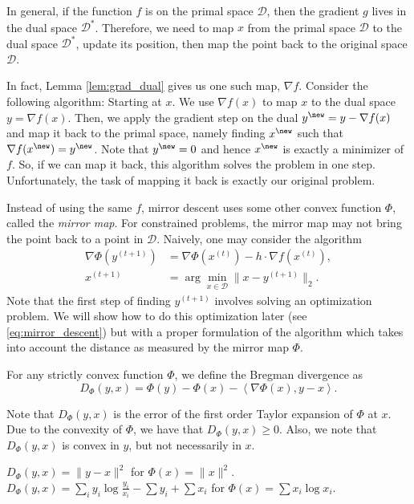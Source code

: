 In general, if the function $f$ is on the primal space $\mathcal{D}$,
then the gradient $g$ lives in the dual space $\mathcal{D}^{*}$.
Therefore, we need to map $x$ from the primal space $\mathcal{D}$
to the dual space $\mathcal{D}^{*}$, update its position, then map
the point back to the original space $\mathcal{D}$.

In fact, Lemma \ref{lem:grad_dual} gives us one such map, $\nabla f$.
Consider the following algorithm: Starting at $x$. We use $\nabla f(x)$
to map $x$ to the dual space $y=\nabla f(x)$. Then, we apply the
gradient step on the dual $y^{\new}=y-\nabla f(x)$ and map it back
to the primal space, namely finding $x^{\new}$ such that $\nabla f(x^{\new})=y^{\new}$.
Note that $y^{\new}=0$ and hence $x^{\new}$ is exactly a minimizer
of $f$. So, if we can map it back, this algorithm solves the problem
in one step. Unfortunately, the task of mapping it back is exactly
our original problem.

Instead of using the same $f$, mirror descent uses some other convex
function $\Phi$, called the \emph{mirror map}. For constrained problems,
the mirror map may not bring the point back to a point in $\mathcal{D}$.
Naively, one may consider the algorithm 
\begin{align*}
\nabla\Phi(y^{(t+1)}) & =\nabla\Phi(x^{(t)})-h\cdot\nabla f(x^{(t)}),\\
x^{(t+1)} & =\arg\min_{x\in\mathcal{D}}\|x-y^{(t+1)}\|_{2}.
\end{align*}
Note that the first step of finding $y^{(t+1)}$ involves solving
an optimization problem. We will show how to do this optimization
later (see \ref{eq:mirror_descent}) but with a proper formulation
of the algorithm which takes into account the distance as measured
by the mirror map $\Phi$.
\begin{defn}
For any strictly convex function $\Phi$, we define the Bregman divergence
as
\[
D_{\Phi}(y,x)=\Phi(y)-\Phi(x)-\left\langle \nabla\Phi(x),y-x\right\rangle .
\]

Note that $D_{\Phi}(y,x)$ is the error of the first order Taylor
expansion of $\Phi$ at $x$. Due to the convexity of $\Phi$, we
have that $D_{\Phi}(y,x)\geq0$. Also, we note that $D_{\Phi}(y,x)$
is convex in $y$, but not necessarily in $x$.
\end{defn}

\begin{example}
$D_{\Phi}(y,x)=\|y-x\|^{2}$ for $\Phi(x)=\|x\|^{2}$. $D_{\Phi}(y,x)=\sum_{i}y_{i}\log\frac{y_{i}}{x_{i}}-\sum y_{i}+\sum x_{i}$
for $\Phi(x)=\sum x_{i}\log x_{i}$.
\end{example}

